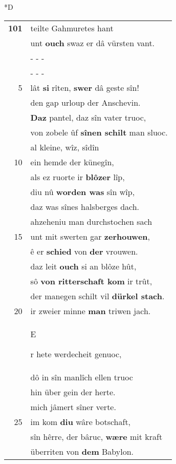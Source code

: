 \documentclass[8pt,a4paper,notitlepage]{article}
\begin{document}
\begin{table}[ht]
\begin{minipage}[t]{0.5\linewidth}
\small
\begin{center}*D
\end{center}
\begin{tabular}{rl}
\textbf{101} & teilte Gahmuretes hant\\ 
 & unt \textbf{ouch} swaz er dâ vürsten vant.\\ 
 & \multicolumn{1}{l}{ - - - }\\ 
 & \multicolumn{1}{l}{ - - - }\\ 
5 & lât \textbf{si} rîten, \textbf{swer} dâ geste sîn!\\ 
 & den gap urloup der Anschevin.\\ 
 & \textbf{Daz} pantel, daz sîn vater truoc,\\ 
 & von zobele ûf \textbf{sînen schilt} man sluoc.\\ 
 & al kleine, wîz, sîdîn\\ 
10 & ein hemde der künegîn,\\ 
 & als ez ruorte ir \textbf{blôzer} lîp,\\ 
 & diu nû \textbf{worden was} sîn wîp,\\ 
 & daz was sînes halsberges dach.\\ 
 & ahzeheniu man durchstochen sach\\ 
15 & unt mit swerten gar \textbf{zerhouwen},\\ 
 & ê er \textbf{schied} von \textbf{der} vrouwen.\\ 
 & daz leit \textbf{ouch} si an blôze hût,\\ 
 & sô \textbf{von ritterschaft kom} ir trût,\\ 
 & der manegen schilt vil \textbf{dürkel stach}.\\ 
20 & ir zweier minne \textbf{man} triwen jach.\\ 
 & \begin{large}E\end{large}r hete werdecheit genuoc,\\ 
 & dô in sîn manlîch ellen truoc\\ 
 & hin über gein der herte.\\ 
 & mich jâmert sîner verte.\\ 
25 & im kom \textbf{diu} wâre botschaft,\\ 
 & sîn hêrre, der bâruc, \textbf{wære} mit kraft\\ 
 & überriten von \textbf{dem} Babylon.\\ 

\end{tabular}
\end{minipage}
\end{table}
\end{document}
